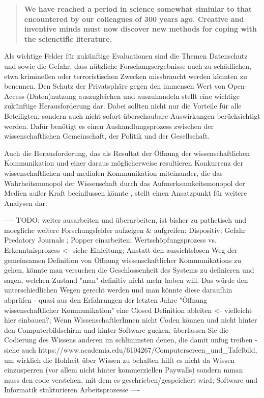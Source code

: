 \begin{quote}
\textbf{We have reached a period in science somewhat simiular to that encountered by our colleagues of 300 years ago. Creative and inventive minds must now discover new methods for coping with the scienctific literature.}
\end{quote} \cite{porter_1964_scientific}

Als wichtige Felder für zukünftige Evaluationen sind die Themen Datenschutz und sowie die Gefahr, dass nützliche Forschungsergebnisse auch zu schädlichen, etwa kriminellen oder terroristischen Zwecken missbraucht werden könnten \cite{Fritsch_2015} zu benennen. Den Schutz der Privatsphäre gegen den immensen Wert von Open-Access-(Daten)nutzung auszugleichen und auszuhandeln stellt eine wichtige zukünftige Herausforderung dar. Dabei sollten nicht nur die Vorteile für alle Beteiligten, sondern auch nicht sofort überschaubare Auswirkungen berücksichtigt werden. Dafür benötigt es einen Aushandlungsprozess zwischen der wissenschaftlichen Gemeinschaft, der Politik und der Gesellschaft.

Auch die Herausforderung, das als Resultat der Öffnung der wissenschaftlichen Kommunikation und einer daraus möglicherweise resultieren Konkurrenz der wissenschaftlichen und medialen Kommunikation miteinander, die das Wahrheitsmonopol der Wissenschaft durch das Aufmerksamkeitsmonopol der Medien außer Kraft beeinflussen könnte \cite{weingart_2005_wissenschaft}, stellt einen Ansatzpunkt für weitere Analysen dar.

---- TODO: weiter ausarbeiten und überarbeiten, ist bisher zu pathetisch und moegliche weitere Forschungsfelder aufzeigen & aufgreifen: Dispositiv; Gefahr Predatory Journals \cite{Beall_2012}; Popper einarbeiten; Wertschöpfungsprozess vs. Erkenntnisprozess <- siehe Einleitung; Anstatt den aussichtslosen Weg der gemeinsamen Definition von Öffnung wissenschaftlicher Kommunikations zu gehen, könnte man versuchen die Geschlossenheit des Systems zu definieren und sagen, welchen Zustand "man" definitiv nicht mehr haben will. Das würde den unterschiedlichen Wegen gerecht werden und man könnte diese daraufhin abprüfen - quasi aus den Erfahrungen der letzten Jahre "Öffnung wissenschaftlicher Kommunikation" eine Closed Definition ableiten <- vielleicht hier einbauen?; Wenn WissenschaftlerInnen nicht Coden können und nicht hinter den Computerbildschirm und hinter Software gucken, überlassen Sie die Codierung des Wissens anderen im schlimmsten denen, die damit unfug treiben - siehe auch https://www.academia.edu/6104267/Computerscreen_und_Tafelbild, um wirklich die Hohheit über Wissen zu behalten hilft es nicht da Wissen einzusperren (vor allem nicht hinter kommerziellen Paywalls) sondern mman muss den code verstehen, mit dem es geschrieben/gespeichert wird; Software und Informatik stukturieren Arbeitsprozesse \cite{Warnke_2012}  ----
